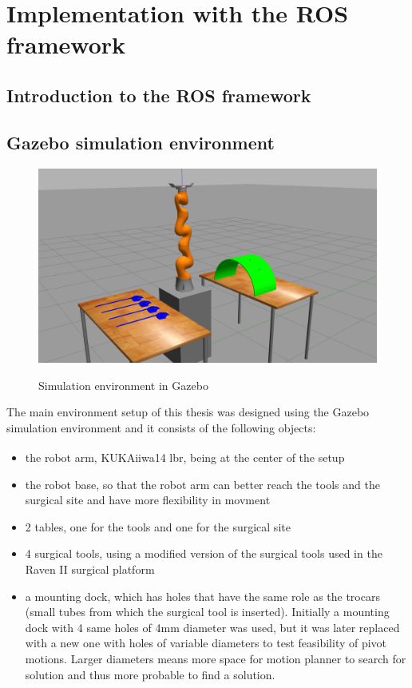\section{Implementation with the ROS framework}

\subsection{Introduction to the ROS framework}

\subsection{Gazebo simulation environment}

\begin{center}
\begin{figure}[H]
\centering
\includegraphics[width=12cm]{images/gazebo-sim1.png}\\
\caption{Simulation environment in Gazebo}
\end{figure}
\end{center}

The main environment setup of this thesis was designed using the Gazebo simulation environment and 
it consists of the following objects:
\begin{itemize}
\item the robot arm, KUKA\textsuperscript \textregistered iiwa14 lbr, being at the center of the setup
\item the robot base, so that the robot arm can better reach the tools and the surgical site and have more flexibility in movment
\item 2 tables, one for the tools and one for the surgical site
\item 4 surgical tools, using a modified version of the surgical tools used in the Raven II surgical platform
\item a mounting dock, which has holes that have the same role as the trocars (small tubes from 
which the surgical tool is inserted). Initially a mounting dock with 4 same holes of 4mm diameter was used, but it was later replaced with a new one with holes of variable diameters to test feasibility of pivot motions. Larger diameters means more space for motion planner to search for solution and thus more probable to find a solution.
\end{itemize}



